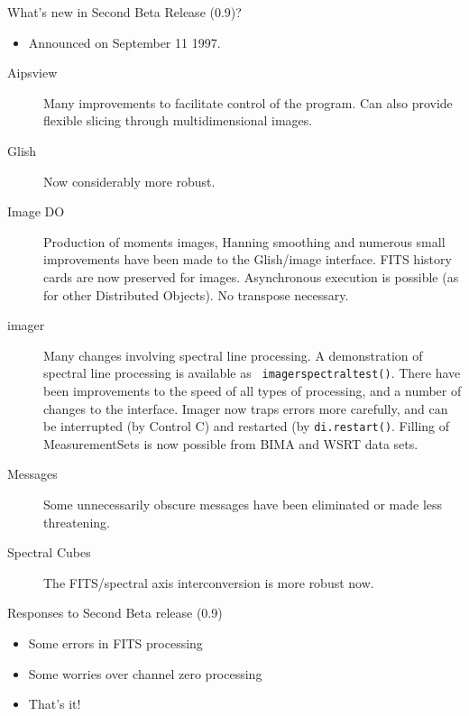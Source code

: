 \documentclass[11pt]{article}
\begin{document}
\begin{slide}{What's new in Second Beta Release (0.9)?}

\begin{itemize}
\item Announced on September 11 1997. 
\end{itemize}
\begin{description}
\item[Aipsview] Many improvements to facilitate control of the
     program. Can also provide flexible slicing through multidimensional
     images.  
\item[Glish] Now considerably more robust. 
\item[Image DO] Production of moments images, Hanning smoothing and 
numerous small improvements have been made to the Glish/image
interface. FITS history cards are now preserved for
images. Asynchronous execution is possible (as for other Distributed
Objects). No transpose necessary.
\item[imager] Many changes involving spectral line processing.
A demonstration of spectral line processing is available as {\tt
imagerspectraltest()}. There have been improvements to the speed of
all types of processing, and a number of changes to the
interface. Imager now traps errors more carefully, and can be
interrupted (by Control C) and restarted (by {\tt di.restart()}.
Filling of MeasurementSets is now possible from BIMA and WSRT
data sets.
\item[Messages] Some unnecessarily obscure messages have been eliminated
or made less threatening.
\item[Spectral Cubes] The FITS/spectral axis interconversion is more
robust now.  
\end{description}
\end{slide}

\begin{slide}{Responses to Second Beta release (0.9)}

\begin{itemize}
\item Some errors in FITS processing
\item Some worries over channel zero processing
\item That's it!
\end{itemize}
\end{slide}
\end{document}
